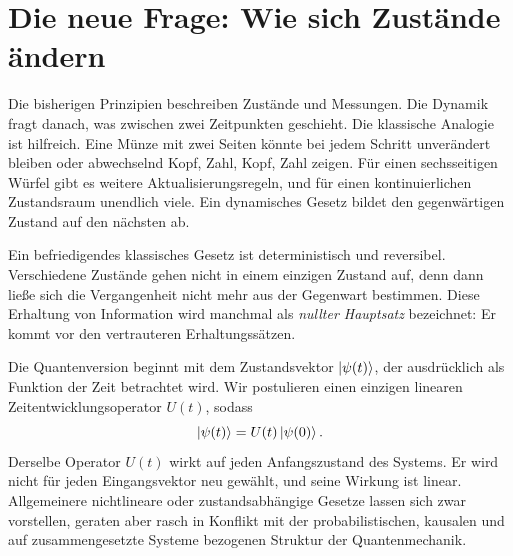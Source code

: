 \begin{classroomqa}\end{classroomqa}

\begin{classroomqa}\end{classroomqa}

\section{Die neue Frage: Wie sich Zustände ändern}

Die bisherigen Prinzipien beschreiben Zustände und Messungen. Die Dynamik fragt danach, was zwischen zwei Zeitpunkten geschieht. Die klassische Analogie ist hilfreich. Eine Münze mit zwei Seiten könnte bei jedem Schritt unverändert bleiben oder abwechselnd Kopf, Zahl, Kopf, Zahl zeigen. Für einen sechsseitigen Würfel gibt es weitere Aktualisierungsregeln, und für einen kontinuierlichen Zustandsraum unendlich viele. Ein dynamisches Gesetz bildet den gegenwärtigen Zustand auf den nächsten ab.

Ein befriedigendes klassisches Gesetz ist deterministisch und reversibel. Verschiedene Zustände gehen nicht in einem einzigen Zustand auf, denn dann ließe sich die Vergangenheit nicht mehr aus der Gegenwart bestimmen. Diese Erhaltung von Information wird manchmal als \emph{nullter Hauptsatz} bezeichnet: Er kommt vor den vertrauteren Erhaltungssätzen.

Die Quantenversion beginnt mit dem Zustandsvektor \(\left\lvert\psi(t)\right\rangle\), der ausdrücklich als Funktion der Zeit betrachtet wird. Wir postulieren einen einzigen linearen Zeitentwicklungsoperator \(U(t)\), sodass
\begin{equation}
\left\lvert\psi(t)\right\rangle=U(t)\left\lvert\psi(0)\right\rangle.
\label{eq:l4-time-development}
\end{equation}
Derselbe Operator \(U(t)\) wirkt auf jeden Anfangszustand des Systems. Er wird nicht für jeden Eingangsvektor neu gewählt, und seine Wirkung ist linear. Allgemeinere nichtlineare oder zustandsabhängige Gesetze lassen sich zwar vorstellen, geraten aber rasch in Konflikt mit der probabilistischen, kausalen und auf zusammengesetzte Systeme bezogenen Struktur der Quantenmechanik.


